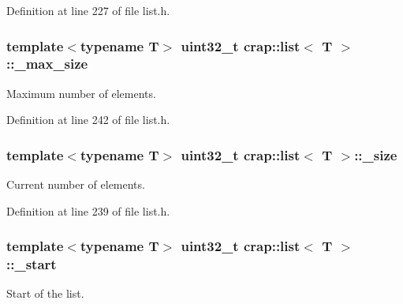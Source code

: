 Definition at line 227 of file list.\+h.

\hypertarget{classcrap_1_1list_ae71931f777bfb9dd77a8a4acfd0eb84c}{}
\subsubsection[{\+\_\+max\+\_\+size}]{\setlength{\rightskip}{0pt plus 5cm}template$<$typename T$>$ uint32\+\_\+t {\bf crap\+::list}$<$ T $>$\+::\+\_\+max\+\_\+size\hspace{0.3cm}{\ttfamily [protected]}}\label{classcrap_1_1list_ae71931f777bfb9dd77a8a4acfd0eb84c}


Maximum number of elements. 



Definition at line 242 of file list.\+h.

\hypertarget{classcrap_1_1list_a8c38722c28fc087444acc484f7b0aa38}{}
\subsubsection[{\+\_\+size}]{\setlength{\rightskip}{0pt plus 5cm}template$<$typename T$>$ uint32\+\_\+t {\bf crap\+::list}$<$ T $>$\+::\+\_\+size\hspace{0.3cm}{\ttfamily [protected]}}\label{classcrap_1_1list_a8c38722c28fc087444acc484f7b0aa38}


Current number of elements. 



Definition at line 239 of file list.\+h.

\hypertarget{classcrap_1_1list_a0bf2b54bd0906b835d8a4d18d41717ce}{}
\subsubsection[{\+\_\+start}]{\setlength{\rightskip}{0pt plus 5cm}template$<$typename T$>$ uint32\+\_\+t {\bf crap\+::list}$<$ T $>$\+::\+\_\+start\hspace{0.3cm}{\ttfamily [protected]}}\label{classcrap_1_1list_a0bf2b54bd0906b835d8a4d18d41717ce}


Start of the list. 



